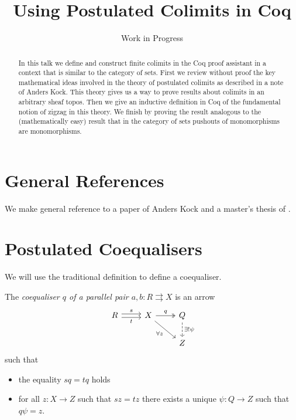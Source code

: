 \documentclass{article}
\title{Using Postulated Colimits in Coq}
\author{Work in Progress}
\begin{document}
\maketitle
\begin{abstract}
  In this talk we define and construct finite colimits in the Coq proof assistant in a context that is similar to the category of sets. First we review without proof the key mathematical ideas involved in the theory of postulated colimits as described in a note of Anders Kock. This theory gives us a way to prove results about colimits in an arbitrary sheaf topos. Then we give an inductive definition in Coq of the fundamental notion of zigzag in this theory. We finish by proving the result analogous to the (mathematically easy) result that in the category of sets pushouts of monomorphisms are monomorphisms.
\end{abstract}
\tableofcontents

\section{General References}
\label{sec:general-references}

We make general reference to a paper \cite{Kock89postulatedcolimits} of Anders Kock and a master's thesis of \cite{carvalho-coq}.

\section{Postulated Coequalisers}
\label{sec:postulated-coequalisers}

We will use the traditional definition to define a coequaliser.

\begin{definition}\label{def:coequaliser}
  The \emph{coequaliser $q$ of a parallel pair $a,b:R \rightrightarrows X$} is an arrow
    \begin{equation*}
      \begin{tikzcd}
       R \rar[yshift=0.5ex]{s} \rar[yshift=-0.5ex][swap]{t} & X \drar[swap]{\forall z} \rar[twoheadrightarrow]{q} & Q \dar[dashed]{\exists !\psi}\\
        & {} & Z
      \end{tikzcd}
    \end{equation*}
    such that
    \begin{itemize}
    \item the equality $sq=tq$ holds
    \item for all $z:X \rightarrow Z$ such that $sz=tz$ there exists a unique $\psi:Q \rightarrow Z$ such that $q\psi = z$.
    \end{itemize}
\end{definition}
\end{document}

